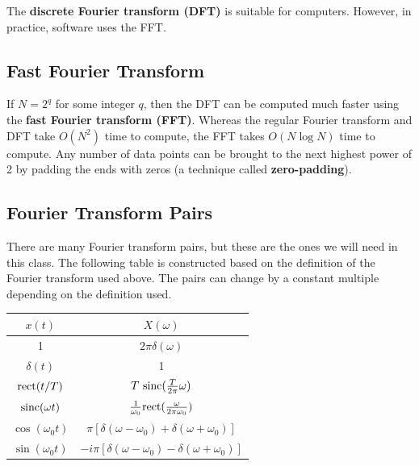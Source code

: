 The \textbf{discrete Fourier transform (DFT)} is suitable for computers. However, in practice, software uses the FFT.

\subsection{Fast Fourier Transform}

If $N = 2^q$ for some integer $q$, then the DFT can be computed much faster using the \textbf{fast Fourier transform (FFT)}. Whereas the regular Fourier transform and DFT take $O(N^2)$ time to compute, the FFT takes $O(N \log N)$ time to compute. Any number of data points can be brought to the next highest power of 2 by padding the ends with zeros (a technique called \textbf{zero-padding}).

\subsection{Fourier Transform Pairs}

There are many Fourier transform pairs, but these are the ones we will need in this class. The following table is constructed based on the definition of the Fourier transform used above. The pairs can change by a constant multiple depending on the definition used.

\begin{table}[H]
    \centering
    \begin{tabular}{cc}
        $x(t)$              & $X(\omega)$                                                    \\
        \hline
        \hline
        1                   & $2\pi \delta(\omega)$                                          \\
        $\delta(t)$         & 1                                                              \\
        $\text{rect}(t/T)$        & $T ~ \text{sinc}(\frac{T}{2\pi} \omega)$                             \\ %
        $\text{sinc}(\omega t)$   & $\frac{1}{\omega_0} \text{rect}(\frac{\omega}{2\pi \omega_0})$       \\ %
        $\cos (\omega_0 t)$ & $\pi[\delta(\omega - \omega_0) + \delta(\omega + \omega_0)]$   \\
        $\sin (\omega_0 t)$ & $-i\pi[\delta(\omega - \omega_0) - \delta(\omega + \omega_0)]$ \\
        \hline
    \end{tabular}
\end{table}

